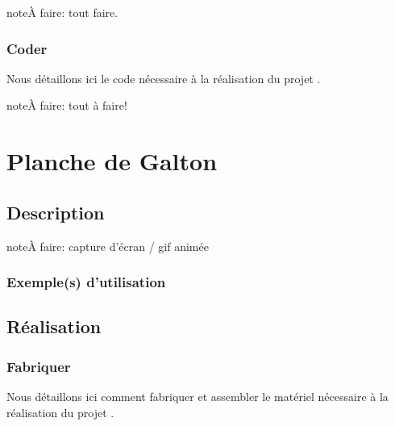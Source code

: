 \documentclass[letterpaper,10pt,french]{sphinxmanual}
\begin{document}
\begin{sphinxadmonition}{note}{\label{projets/coffre-fabriquer:index-0}À faire:}
tout faire.
\end{sphinxadmonition}

\ignorespaces 

\subsubsection{Coder}
\label{\detokenize{projets/coffre-coder:index-0}}\label{\detokenize{projets/coffre-coder:coder}}\label{\detokenize{projets/coffre-coder::doc}}
Nous détaillons ici le code nécessaire à la réalisation
du projet {\hyperref[\detokenize{projets/coffre:projetcoffre}]{}}.

\begin{sphinxadmonition}{note}{\label{projets/coffre-coder:index-1}À faire:}
tout à faire!
\end{sphinxadmonition}


\section{Planche de Galton}
\label{\detokenize{projets/galton:planche-de-galton}}\label{\detokenize{projets/galton::doc}}\label{\detokenize{projets/galton:projetgalton}}

\subsection{Description}
\label{\detokenize{projets/galton:description}}
\begin{sphinxadmonition}{note}{\label{projets/galton:index-0}À faire:}
capture d’écran / gif animée
\end{sphinxadmonition}


\subsubsection{Exemple(s) d’utilisation}
\label{\detokenize{projets/galton:exemple-s-d-utilisation}}

\subsection{Réalisation}
\label{\detokenize{projets/galton:realisation}}

\subsubsection{Fabriquer}
\label{\detokenize{projets/galton-fabriquer::doc}}\label{\detokenize{projets/galton-fabriquer:fabriquer}}
Nous détaillons ici comment fabriquer et assembler
le matériel nécessaire à la réalisation du projet
{\hyperref[\detokenize{projets/galton:projetgalton}]{}}.
\end{document}
